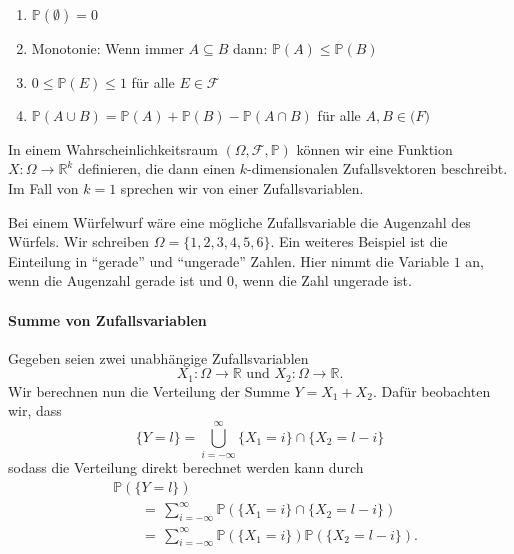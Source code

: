 \begin{enumerate}
	\item $\mathbb{P} (\emptyset) = 0$
	\item Monotonie: Wenn immer $A\subseteq B$ dann: $\mathbb{P} (A) \leq \mathbb{P} (B)$
	\item $0 \leq \mathbb{P} (E) \leq 1$   f\"ur alle $E \in \mathcal{F}$
	\item $ \mathbb{P} (A \cup B) = \mathbb{P} (A) + \mathbb{P} (B) - \mathbb{P} (A \cap B)$ f\"ur alle $A,B \in \mathcal(F)$
\end{enumerate}

\begin{Def}
In einem Wahrscheinlichkeitsraum $(\Omega, \mathcal{F}, \mathbb{P})$ k\"onnen wir eine Funktion $X:\Omega \rightarrow \mathbb{R}^k$  definieren, die dann einen $k$-dimensionalen Zufallsvektoren beschreibt. Im Fall von $k=1$ sprechen wir von einer Zufallsvariablen.
\end{Def}

Bei einem W\"urfelwurf w\"are eine m\"ogliche Zufallsvariable die Augenzahl des W\"urfels. Wir schreiben $\Omega =  \{1,2,3,4,5,6\}$. 
Ein weiteres Beispiel ist die Einteilung in \enquote{gerade} und \enquote{ungerade} Zahlen. Hier nimmt die Variable $1$ an, wenn die Augenzahl gerade ist und $0$, wenn die Zahl ungerade ist.

\vspace{10pt}

\paragraph {Summe von Zufallsvariablen}
Gegeben seien zwei unabhängige Zufallsvariablen
\begin{equation*}
X_{1}:\Omega \rightarrow \mathbb{R} \text{ und }  X_{2}:\Omega \rightarrow \mathbb{R}.
\end{equation*}
Wir berechnen nun die Verteilung der Summe $Y=X_{1}+X_{2}$. Daf\"ur beobachten wir,  dass
\begin{equation*}
\{Y=l\}=\bigcup_{i=-\infty}^{\infty} \{X_{1}=i\} \cap \{X_{2}=l-i\}
\end{equation*}
sodass die Verteilung direkt berechnet werden kann durch
\begin{align}
\label{eq:zvsumme}
&\mathbb{P} (\{Y=l\})\\
&\qquad=\, \sum_{i=-\infty}^{\infty} \mathbb{P} (\{X_{1}=i\} \cap \{X_{2}=l-i\})\nonumber\\
&\qquad=\, \sum_{i=-\infty}^{\infty} \mathbb{P} (\{X_{1} = i\})  \mathbb{P} (\{X_{2}=l-i\}) \nonumber. 
\end{align}


